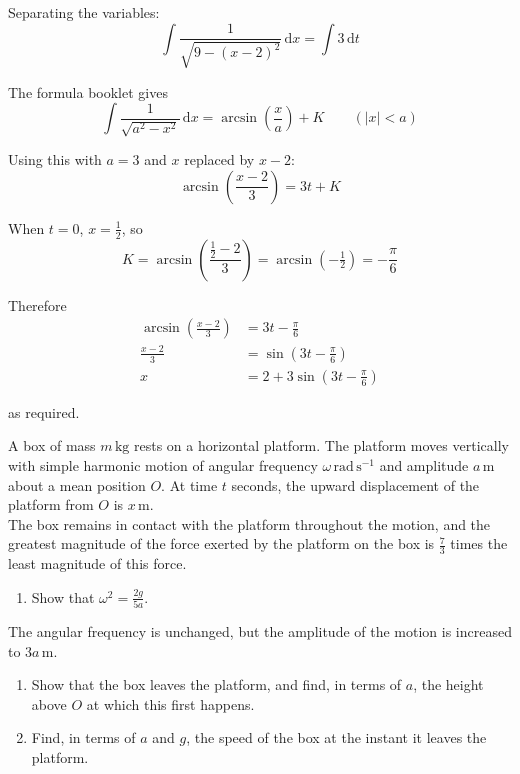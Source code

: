 \documentclass[leqno]{article}
\begin{document}
\begin{enumerate}[
  label=\textbf{\arabic*.},
  leftmargin=*,
  topsep=0pt,
  partopsep=0pt,
  parsep=0pt
]
\begin{djsSolution}
\begin{enumerate}[label=\textbf{(\alph*)}, start=1]
Separating the variables:
\[
\int\frac{1}{\sqrt{9-(x-2)^2}}\,\mathrm{d}x=\int 3\,\mathrm{d}t
\]

The formula booklet gives
\[
\int\frac{1}{\sqrt{a^2-x^2}}\,\mathrm{d}x=\arcsin\left(\frac{x}{a}\right)+K\qquad(|x|<a)
\]

Using this with \(a=3\) and \(x\) replaced by \(x-2\):
\[
\arcsin\left(\frac{x-2}{3}\right)=3t+K
\]

When \(t=0\), \(x=\frac12\), so
\[
K=\arcsin\left(\frac{\frac12-2}{3}\right)=\arcsin\left(-\tfrac12\right)=-\frac{\pi}{6}
\]

Therefore
\begin{align*}
\arcsin\left(\frac{x-2}{3}\right)&=3t-\frac{\pi}{6}\\
\frac{x-2}{3}&=\sin\left(3t-\frac{\pi}{6}\right)\\
x&=2+3\sin\left(3t-\frac{\pi}{6}\right)
\end{align*}

as required.
\end{enumerate}
\end{djsSolution}

\newpage

\questionitem

A box of mass $m\,\mathrm{kg}$ rests on a horizontal platform. The platform moves vertically with simple harmonic motion of angular frequency $\omega\,\mathrm{rad\,s^{-1}}$ and amplitude $a\,\mathrm{m}$ about a mean position $O$. At time $t$ seconds, the upward displacement of the platform from $O$ is $x\,\mathrm{m}$. \\
The box remains in contact with the platform throughout the motion, and the greatest magnitude of the force exerted by the platform on the box is $\frac{7}{3}$ times the least magnitude of this force. \\
\begin{enumerate}[label=\textbf{(\alph*)}]
\item Show that $\omega^2=\frac{2g}{5a}$.  \\
\end{enumerate}
The angular frequency is unchanged, but the amplitude of the motion is increased to $3a\,\mathrm{m}$. \\
\begin{enumerate}[label=\textbf{(\alph*)}, resume]
\item Show that the box leaves the platform, and find, in terms of $a$, the height above $O$ at which this first happens.  \\
\item Find, in terms of $a$ and $g$, the speed of the box at the instant it leaves the platform.  \\
\end{enumerate}


\end{enumerate}
\end{document}
